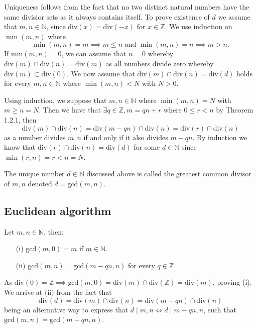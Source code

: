 \begin{prf}
    Uniqueness follows from the fact that no two distinct natural numbers have the same divisior sets as it always contains itself. To prove existence of $d$ we assume that $m,n\in\mathbb{N}$, since $\text{div}(x)=\text{div}(-x)$ for $x\in\mathbb{Z}$. We use induction on $\min(m,n)$ where
    \[
        \min(m,n)=m\implies m\leq n\text{ and }\min(m,n)=n\implies m>n
    .\]
    If $\text{min}(m,n)=0$, we can assume that $n=0$ whereby $\text{div}(m)\cap\text{div}(n)=\text{div}(m)$ as all numbers divide zero whereby $\text{div}(m)\subset\text{div}(0)$. We now assume that $\text{div}(m)\cap\text{div}(n)=\text{div}(d)$ holds for every $m,n\in\mathbb{N}$ where $\min(m,n)<N$ with $N>0$.

    Using induction, we suppose that $m,n\in\mathbb{N}$ where $\min(m,n)=N$ with $m\geq n=N$. Then we have that $\exists q\in\mathbb{Z},m=qn+r$ where $0\leq r<n$ by Theorem 1.2.1, then 
    \[
        \text{div}(m)\cap\text{div}(n)=\text{div}(m-qn)\cap\text{div}(n)=\text{div}(r)\cap\text{div}(n)
    \]
    as a number divides $m,n$ if and only if it also divides $m-qn$. By induction we know that $\text{div}(r)\cap\text{div}(n)=\text{div}(d)$ for some $d\in\mathbb{N}$ since $\min(r,n)=r<n=N$.
\end{prf}
\begin{defi}
    The unique number $d\in\mathbb{N}$ discussed above is called the greatest common divisor of $m,n$ denoted $d=\text{gcd}(m,n)$.
\end{defi}
\pagebreak\subsection{Euclidean algorithm}
\begin{prop}
    Let $m,n\in\mathbb{N}$, then:
    \begin{itemize}
        \item[(i)] $\text{gcd}(m,0)=m$ if $m\in\mathbb{N}$.
        \item[(ii)] $\text{gcd}(m,n)=\text{gcd}(m-qn,n)$ for every $q\in\mathbb{Z}$.
    \end{itemize}
\end{prop}
\begin{prf}
    As $\text{div}(0)=\mathbb{Z}\implies\text{gcd}(m,0)=\text{div}(m)\cap\text{div}(\mathbb{Z})=\text{div}(m)$, proving (i). We arrive at (ii) from the fact that
    \[
        \text{div}(d)=\text{div}(m)\cap\text{div}(n)=\text{div}(m-qn)\cap\text{div}(n)
    \]
    being an alternative way to express that $d\mid m,n\iff d\mid m-qn,n$, such that $\text{gcd}(m,n)=\text{gcd}(m-qn,n)$.
\end{prf}
